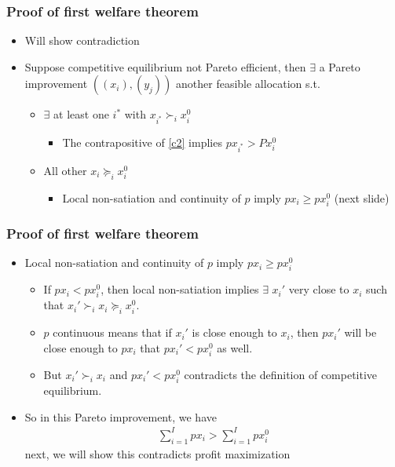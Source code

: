 \documentclass[compress]{beamer}
\newcommand{\prefeq}{\succeq}
\newcommand{\pref}{\succ}
\begin{document}
\begin{frame}
  \frametitle{Proof of first welfare theorem}
  \begin{itemize}
  \item Will show contradiction
  \item Suppose competitive equilibrium not Pareto efficient, then
    $\exists$ a Pareto improvement $((x_i),(y_j))$ another feasible
    allocation s.t.
    \begin{itemize}
    \item $\exists $ at least one $i^*$ with $x_{i^*} \pref_i x_i^0$
      \begin{itemize}
      \item The contrapositive of \ref{c2} implies $p x_{i^*} > P
        x_i^0$
      \end{itemize}
    \item All other $x_i \prefeq_i x_i^0$ 
      \begin{itemize}
      \item Local non-satiation and continuity of $p$ imply $p x_i
        \geq p x_i^0$  (next slide)
      \end{itemize}
    \end{itemize}
  \end{itemize}
\end{frame}

\begin{frame}
  \frametitle{Proof of first welfare theorem}
  \begin{itemize}
  \item Local non-satiation and continuity of $p$ imply $p x_i
    \geq p x_i^0$  
    \begin{itemize}
    \item If $p x_i < p x_i^0$, then local non-satiation implies
      $\exists$ $x_i'$ very close to $x_i$ such that $x_i' \pref_i x_i
      \prefeq_i x_i^0$. 
    \item $p$ continuous means that if $x_i'$ is close enough to
      $x_i$, then $p x_i'$ will be close enough to $p x_i$ that 
      $p x_i' < p x_i^0$ as well. 
    \item But $x_i' \pref_i x_i$ and $p x_i' < p x_i^0$ contradicts
      the definition of competitive equilibrium.
    \end{itemize}
  \item So in this Pareto improvement, we have
    \begin{align}
     \sum_{i=1}^I p x_i > \sum_{i=1}^I p x_i^0
    \end{align}
    next, we will show this contradicts profit maximization
  \end{itemize}
\end{frame}
\end{document}
